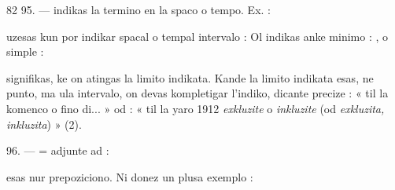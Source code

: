 \begin{VUpage}[86]{82}
\VUblanc{5.58pt}%
95. ---  indikas la termino en la spaco o tempo. Ex. :\nl
{}

 uzesas kun  por indikar spacal o tempal intervalo :\nl
{} Ol indikas anke\nl
minimo : , o simple :\nl
{}

 signifikas, ke on atingas la limito indikata. Kande\nl
la limito indikata esas, ne punto, ma ula intervalo, on devas\nl
kompletigar l'indiko, dicante precize : « til la komenco o\nl
fino di... » od : « til la yaro 1912 \textit{exkluzite} o \textit{inkluzite} (od\nl
\textit{exkluzita, inkluzita}) » (2).

\VUblanc{5.94pt}%
96. ---  = adjunte ad : \nl
{}\nl
{}

 esas nur prepoziciono. Ni donez un plusa exemplo :\parplein
\end{VUpage}

